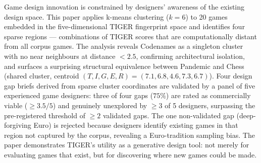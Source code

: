 Game design innovation is constrained by designers' awareness of the existing design
space. This paper applies k-means clustering ($k = 6$) to 20 games embedded in the
five-dimensional TIGER fingerprint space and identifies four sparse regions ---
combinations of TIGER scores that are computationally distant from all corpus games.
The analysis reveals Codenames as a singleton cluster with no near neighbours at
distance $< 2.5$, confirming architectural isolation, and surfaces a surprising
structural equivalence between Pandemic and Chess (shared cluster, centroid
$(T, I, G, E, R) = (7.1, 6.8, 4.6, 7.3, 6.7)$). Four design gap briefs derived from
sparse cluster coordinates are validated by a panel of five experienced game designers:
three of four gaps ($75\%$) are rated as commercially viable ($\geq 3.5/5$) and
genuinely unexplored by $\geq 3$ of 5 designers, surpassing the pre-registered threshold
of $\geq 2$ validated gaps. The one non-validated gap (deep-forgiving Euro) is rejected
because designers identify existing games in that region not captured by the corpus,
revealing a Euro-tradition sampling bias. The paper demonstrates TIGER's utility as a
generative design tool: not merely for evaluating games that exist, but for discovering
where new games could be made.
